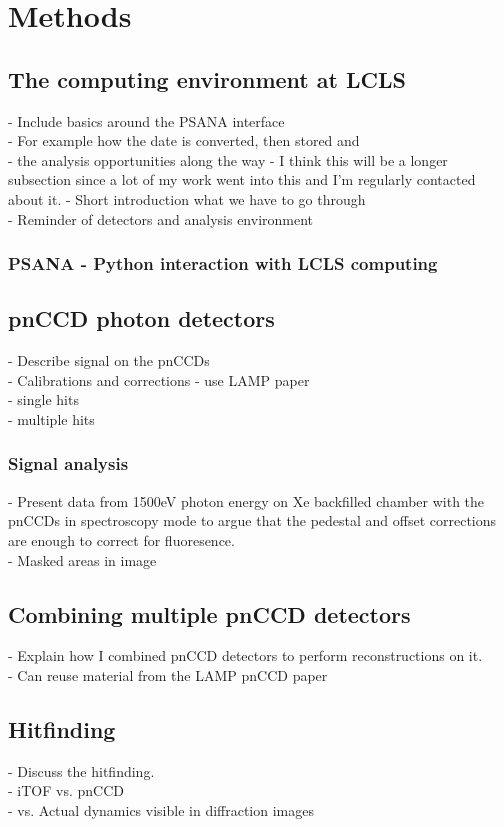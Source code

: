 \chapter{Methods}\label{ch:methods}
\section{The computing environment at LCLS}
- Include basics around the PSANA interface\\
- For example how the date is converted, then stored and\\
- the analysis opportunities along the way
- I think this will be a longer subsection since a lot of my work went into this and I'm regularly contacted about it.
- Short introduction what we have to go through\\
- Reminder of detectors and analysis environment
\subsection{PSANA - Python interaction with LCLS computing}
\section{pnCCD photon detectors}\label{sec:pnccd-corr}
- Describe signal on the pnCCDs\\
- Calibrations and corrections - use LAMP paper\\
- single hits\\
- multiple hits
\subsection{Signal analysis}
- Present data from 1500eV photon energy on Xe backfilled chamber with the pnCCDs in spectroscopy mode to argue that the pedestal and offset corrections are enough to correct for fluoresence.\\
- Masked areas in image
\section{Combining multiple pnCCD detectors}
- Explain how I combined pnCCD detectors to perform reconstructions on it.\\
- Can reuse material from the LAMP pnCCD paper
\section{Hitfinding}
- Discuss the hitfinding.\\
- iTOF vs. pnCCD\\
- vs. Actual dynamics visible in diffraction images

